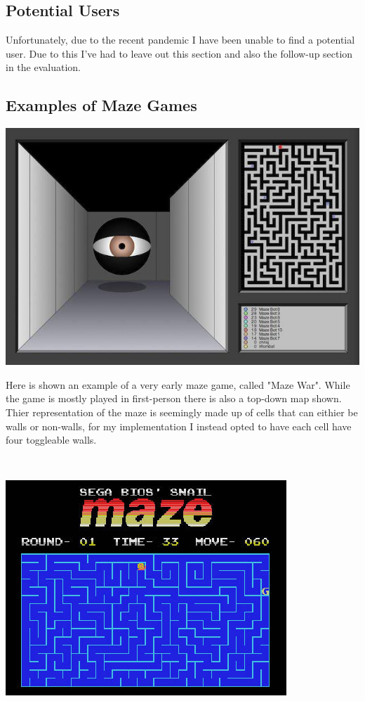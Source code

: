 \documentclass{article}
\begin{document}
\subsection{Potential Users}
Unfortunately, due to the recent pandemic I have been unable to find a potential user. Due to this I've had to leave out this section and also the follow-up section
in the evaluation.
\\


\clearpage
\subsection{Examples of Maze Games}
\begin{minipage}{0.4\textwidth}
\includegraphics[scale=0.3]{example of old maze}
\end{minipage}
\begin{minipage}{0.5\textwidth}\raggedright
Here is shown an example of a very early maze game, called "Maze War". While the game is mostly played in first-person there is also a top-down map
shown. Thier representation of the maze is seemingly made up of cells that can eithier be walls or non-walls, for my implementation I instead opted to
have each cell have four toggleable walls. 
\end{minipage}
\linebreak
\\
\linebreak
\begin{minipage}{0.4\textwidth}
\includegraphics[scale=0.48]{better example}
\end{minipage}
\end{document}
